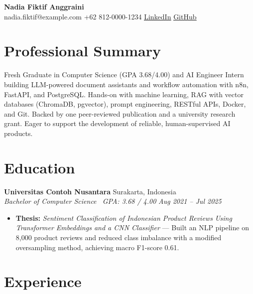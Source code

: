 \documentclass[a4paper,11pt]{article}
\newcommand{\resumeItem}[1]{\item\small{#1}}
\newcommand{\resumeSubheading}[4]{
  \vspace{2pt}
  \noindent\textbf{#1} \hfill #2 \\
  \noindent\textit{\small #3} \hfill \textit{\small #4}
  \vspace{-4pt}
}
\begin{document}
\begin{center}
    {\LARGE \textbf{Nadia Fiktif Anggraini}}\\[6pt]
    nadia.fiktif@example.com
    \hspace{2pt}\textbar\hspace{2pt}
    +62 812-0000-1234
    \hspace{2pt}\textbar\hspace{2pt}
    \textcolor{linkblue}{\uline{\href{https://example.com/in/nadia-fiktif}{LinkedIn}}}
    \hspace{2pt}\textbar\hspace{2pt}
    \textcolor{linkblue}{\uline{\href{https://example.com/nadia-fiktif}{GitHub}}}
\end{center}

\section{Professional Summary}
Fresh Graduate in Computer Science (GPA 3.68/4.00) and AI Engineer Intern building LLM-powered document assistants and workflow automation with n8n, FastAPI, and PostgreSQL. Hands-on with machine learning, RAG with vector databases (ChromaDB, pgvector), prompt engineering, RESTful APIs, Docker, and Git. Backed by one peer-reviewed publication and a university research grant. Eager to support the development of reliable, human-supervised AI products.

\section{Education}
\resumeSubheading
    {Universitas Contoh Nusantara}{Surakarta, Indonesia}
    {Bachelor of Computer Science \textemdash\ GPA: 3.68 / 4.00}{Aug 2021 -- Jul 2025}
\begin{itemize}
  \resumeItem{\textbf{Thesis:} \textit{Sentiment Classification of Indonesian Product Reviews Using Transformer Embeddings and a CNN Classifier} --- Built an NLP pipeline on 8,000 product reviews and reduced class imbalance with a modified oversampling method, achieving macro F1-score 0.61.}
\end{itemize}

\section{Experience}
\end{document}

